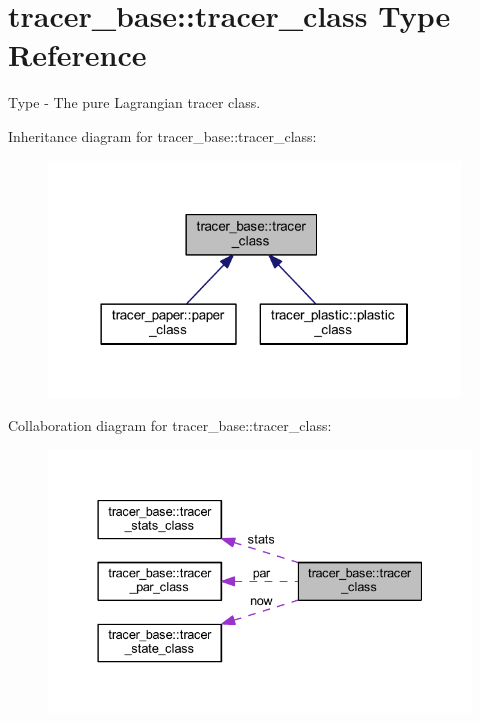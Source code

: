 \hypertarget{structtracer__base_1_1tracer__class}{}\section{tracer\+\_\+base\+:\+:tracer\+\_\+class Type Reference}
\label{structtracer__base_1_1tracer__class}


Type -\/ The pure Lagrangian tracer class.  




Inheritance diagram for tracer\+\_\+base\+:\+:tracer\+\_\+class\+:
\nopagebreak
\begin{figure}[H]
\begin{center}
\leavevmode
\includegraphics[width=310pt]{structtracer__base_1_1tracer__class__inherit__graph}
\end{center}
\end{figure}


Collaboration diagram for tracer\+\_\+base\+:\+:tracer\+\_\+class\+:
\nopagebreak
\begin{figure}[H]
\begin{center}
\leavevmode
\includegraphics[width=337pt]{structtracer__base_1_1tracer__class__coll__graph}
\end{center}
\end{figure}
